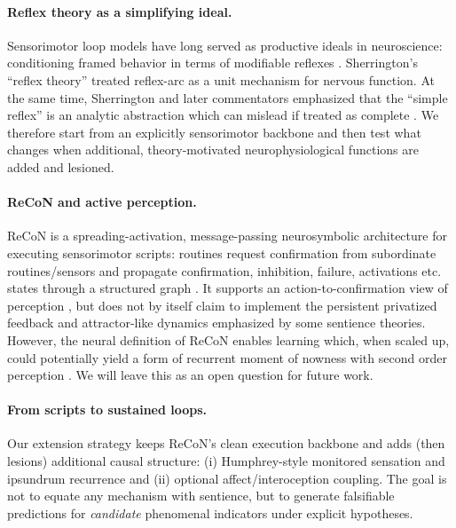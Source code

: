 \documentclass[letterpaper]{article} %
\begin{document}
\paragraph{Reflex theory as a simplifying ideal.}
Sensorimotor loop models have long served as productive ideals in neuroscience: conditioning framed behavior in terms of modifiable reflexes \citep{Pavlov1927ConditionedReflexes}. Sherrington's ``reflex theory'' \citep{Sherrington1906Integrative} 
treated reflex-arc as a unit mechanism for nervous function. At the same time, Sherrington and later commentators emphasized that the ``simple reflex'' is an analytic abstraction which can mislead if treated as complete \citep{Chirimuuta2024BrainAbstracted}. We therefore start from an explicitly sensorimotor backbone and then test what changes when additional, theory-motivated neurophysiological functions are added and lesioned.

\paragraph{ReCoN and active perception.}
ReCoN is a spreading-activation, message-passing neurosymbolic architecture for executing sensorimotor scripts: routines request confirmation from subordinate routines/sensors and propagate confirmation, inhibition, failure, activations etc. states through a structured graph \citep{BachHerger2015ReCoN}.
It supports an action-to-confirmation view of perception \citep{OReganNoe2001Sensorimotor}, but does not by itself claim to implement the persistent privatized feedback and attractor-like dynamics emphasized by some sentience theories.
However, the neural definition of ReCoN enables learning which, when scaled up, could potentially yield a form of recurrent moment of nowness with second order perception \citep{BachHerger2015ReCoN,Bach2009PSI,Varela1999SpeciousPresent,Lamme2006NeuralStance,LauRosenthal2011EmpiricalHOT,Cleeremans2011RadicalPlasticity}.
We will leave this as an open question for future work.

\paragraph{From scripts to sustained loops.}
Our extension strategy keeps ReCoN's clean execution backbone and adds (then lesions) additional causal structure: (i) Humphrey-style monitored sensation and ipsundrum recurrence and (ii) optional affect/interoception coupling.
The goal is not to equate any mechanism with sentience, but to generate falsifiable predictions for \emph{candidate} phenomenal indicators under explicit hypotheses.
\end{document}
